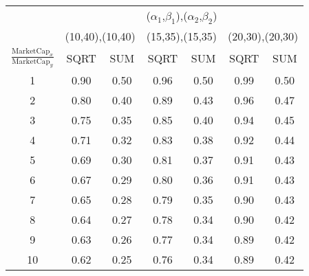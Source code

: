           \scriptsize
    \begin{tabular}{ccccccc}
    \hline\hline
  & \multicolumn{6}{c}{\tiny($ \alpha_1 $,$ \beta_1 $),($ \alpha_2 $,$ \beta_2 $) }\\ \cmidrule(lr){2-7}
               & \multicolumn{2}{c}{\tiny(10,40),(10,40)} & \multicolumn{2}{c}{\tiny(15,35),(15,35)} & \multicolumn{2}{c}{\tiny(20,30),(20,30)} \\ \cmidrule(lr){2-3}\cmidrule(lr){4-5}\cmidrule(lr){6-7}
    \tiny $ \frac{\text{MarketCap}_x}{\text{MarketCap}_y} $     &\tiny SQRT  & \tiny SUM   &\tiny SQRT  &\tiny SUM   &\tiny SQRT  &\tiny SUM \\ 
     \hline\addlinespace

         1     & 0.90  & 0.50  & 0.96  & 0.50  & 0.99  & 0.50 \\
         2     & 0.80  & 0.40  & 0.89  & 0.43  & 0.96  & 0.47 \\
         3     & 0.75  & 0.35  & 0.85  & 0.40  & 0.94  & 0.45 \\
         4     & 0.71  & 0.32  & 0.83  & 0.38  & 0.92  & 0.44 \\
         5     & 0.69  & 0.30  & 0.81  & 0.37  & 0.91  & 0.43 \\
         6     & 0.67  & 0.29  & 0.80  & 0.36  & 0.91  & 0.43 \\
         7     & 0.65  & 0.28  & 0.79  & 0.35  & 0.90  & 0.43 \\
         8     & 0.64  & 0.27  & 0.78  & 0.34  & 0.90  & 0.42 \\
         9     & 0.63  & 0.26  & 0.77  & 0.34  & 0.89  & 0.42 \\
         10    & 0.62  & 0.25  & 0.76  & 0.34  & 0.89  & 0.42 \\
     
    \hline\hline
    \end{tabular}